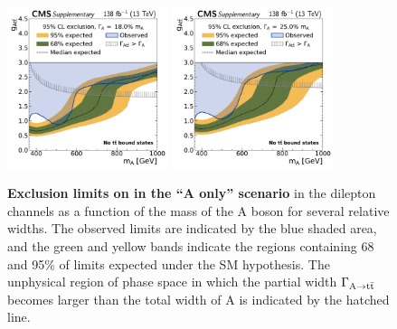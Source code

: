 \begin{figure}[!ph]
    \\
    \includegraphics[width=0.42\textwidth]{figures/ah/lim1D/smtt/ll/A_limit_w18p0_g-scan.pdf}%
    \hspace*{0.05\textwidth}%
    \includegraphics[width=0.42\textwidth]{figures/ah/lim1D/smtt/ll/A_limit_w25p0_g-scan.pdf}
    \caption{%
        \textbf{Exclusion limits on \gAtt in the ``A only'' scenario} in the dilepton channels as a function of the mass of the A boson for several relative widths.
        The observed limits are indicated by the blue shaded area, and the green and yellow bands indicate the regions containing 68 and 95\% of limits expected under the SM hypothesis.
        The unphysical region of phase space in which the partial width $\Gamma_{\mathrm{A \rightarrow \mathrm{t \bar{t}}}}$ becomes larger than the total width of A is indicated by the hatched line.
    }
    \label{fig:ah:limit_1D_a_smtt}
\end{figure}
    
